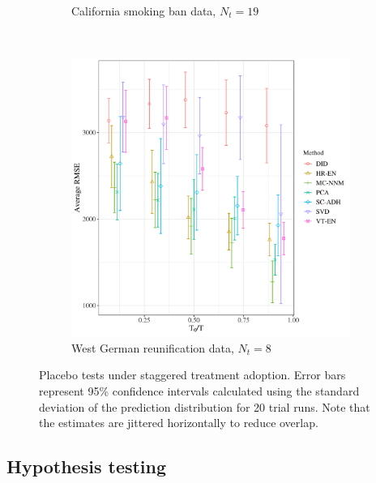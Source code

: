 \documentclass[12pt]{article}
\begin{document}
\begin{figure}[htbp]
\begin{subfigure}[t]{0.45\textwidth}
		\caption{California smoking ban data, $N_t = 19$}
	\end{subfigure}
	~ 
	\begin{subfigure}[t]{0.45\textwidth}
		\centering
		\includegraphics[width=\textwidth]{plots/germany_N_16_T_44_numruns_20_num_treated_8_simultaneuous_0.png}
		\caption{West German reunification data, $N_t = 8$}
	\end{subfigure}
	\caption{Placebo tests under staggered treatment adoption. Error bars represent 95\% confidence intervals calculated using the standard deviation of the prediction distribution for 20 trial runs. Note that the estimates are jittered horizontally to reduce overlap. \label{synth-stag}} 
\end{figure}

\subsection{Hypothesis testing}
\end{document}
